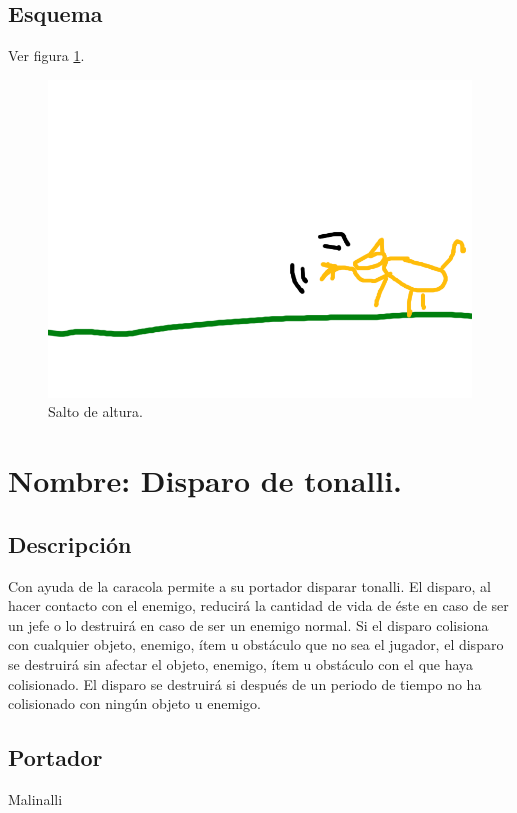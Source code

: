 			\subsection{Esquema}
			Ver figura \ref{fig:SalAl}.
			\begin{figure}
				\centering
				\includegraphics[height=0.2 \textheight]{Imagenes/zarpazo}
				\caption{Salto de altura.}
				\label{fig:SalAl}
			\end{figure}
			
\section{Nombre: Disparo de tonalli.}\label{hab.disparoT}
\subsection{Descripción}
Con ayuda de la caracola permite a su portador disparar tonalli. El disparo, al hacer contacto con el enemigo, reducirá la cantidad de vida de éste en caso de ser un jefe o lo destruirá en caso de ser un enemigo normal. Si el disparo colisiona con cualquier objeto, enemigo, ítem u obstáculo que no sea el jugador, el disparo se destruirá sin afectar el objeto, enemigo, ítem u obstáculo con el que haya colisionado. El disparo se destruirá si después de un periodo de tiempo no ha colisionado con ningún objeto u enemigo.
\subsection{Portador}
Malinalli
